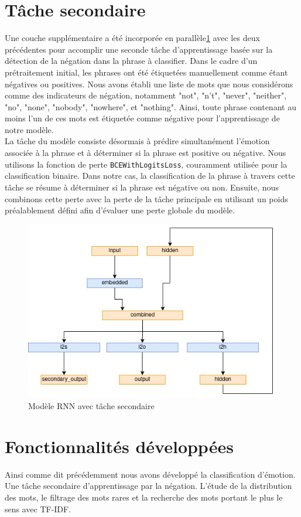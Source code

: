 \documentclass{article}
\begin{document}
\section{Tâche secondaire}
Une couche supplémentaire a été incorporée en parallèle\ref{fig:modele_rnn_with_secondary} avec les deux précédentes pour accomplir une seconde tâche d'apprentissage basée sur la détection de la négation dans la phrase à classifier. Dans le cadre d'un prétraitement initial, les phrases ont été étiquetées manuellement comme étant négatives ou positives. Nous avons établi une liste de mots que nous considérons comme des indicateurs de négation, notamment "not", "n't", "never", "neither", "no", "none", "nobody", "nowhere", et "nothing". Ainsi, toute phrase contenant au moins l'un de ces mots est étiquetée comme négative pour l'apprentissage de notre modèle. \\
La tâche du modèle consiste désormais à prédire simultanément l'émotion associée à la phrase et à déterminer si la phrase est positive ou négative. Nous utilisons la fonction de perte \texttt{BCEWithLogitsLoss}, couramment utilisée pour la classification binaire. Dans notre cas, la classification de la phrase à travers cette tâche se résume à déterminer si la phrase est négative ou non. Ensuite, nous combinons cette perte avec la perte de la tâche principale en utilisant un poids préalablement défini afin d'évaluer une perte globale du modèle.

\begin{figure}[H]
    \centering
    \includegraphics[width=0.5\linewidth]{img/modele_with_secondary.png}
    \caption{Modèle RNN avec tâche secondaire}

    \label{fig:modele_rnn_with_secondary}
\end{figure}

\section{Fonctionnalités développées}
Ainsi comme dit précédemment nous avons développé la classification d’émotion. Une tâche secondaire d’apprentissage par la négation. L’étude de la distribution des mots, le filtrage des mots rares et la recherche des mots portant le plus le sens avec TF-IDF.
\end{document}
